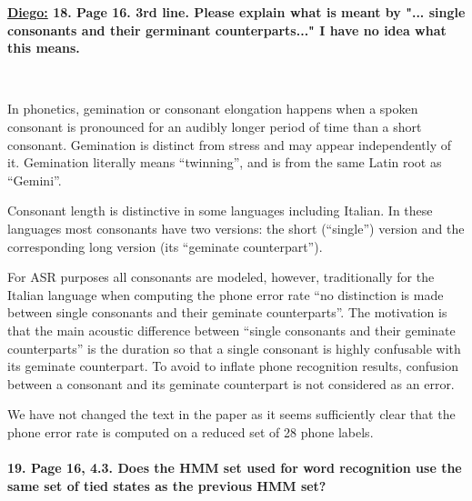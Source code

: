 \documentclass[]{article}
\begin{document}
\textbf{\underline{Diego:} 18. Page 16. 3rd line. Please explain what is meant by "... single consonants and their germinant counterparts..." I have no idea what this means.}

~

In phonetics, gemination or consonant elongation happens when a spoken
consonant is  pronounced for an audibly  longer period of  time than a
short  consonant. Gemination is  distinct from  stress and  may appear
independently of  it. Gemination literally means  ``twinning'', and is
from the same Latin root as ``Gemini''.

Consonant length  is distinctive in some  languages including Italian.
In  these  languages most  consonants  have  two  versions: the  short
(``single'') version  and the corresponding long  version (its ``geminate                                                 
counterpart'').

For ASR  purposes all  consonants are modeled,  however, traditionally
for  the Italian  language when  computing the  phone error  rate ``no                                                    
distinction  is  made between  single  consonants  and their  geminate                                                    
counterparts''. The  motivation is  that the main  acoustic difference
between ``single  consonants and their geminate  counterparts'' is the
duration  so that  a single  consonant is  highly confusable  with its
geminate counterpart.  To avoid to inflate  phone recognition results,
confusion  between a  consonant and  its geminate  counterpart  is not
considered as an error.

We have  not changed the  text in the  paper as it  seems sufficiently
clear that  the phone error rate is  computed on a reduced  set of 28
phone labels.


\paragraph{19. Page 16, 4.3. Does the HMM set used for word recognition use the same set of tied states as the previous HMM set?}
\end{document}

